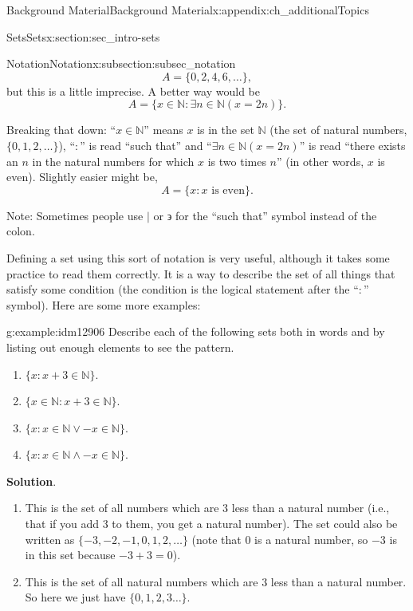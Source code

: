 \documentclass[oneside,10pt,]{book}
\numberwithin{equation}{chapter}
\def\N{\mathbb N}
\def\st{:}
\begin{document}
\begin{appendixptx}{Background Material}{}{Background Material}{}{}{x:appendix:ch_additionalTopics}
\begin{sectionptx}{Sets}{}{Sets}{}{}{x:section:sec_intro-sets}
\begin{subsectionptx}{Notation}{}{Notation}{}{}{x:subsection:subsec_notation}
\begin{equation*}
A = \{0, 2, 4, 6, \ldots\},
\end{equation*}
but this is a little imprecise. A better way would be%
\begin{equation*}
A = \{x \in \N \st \exists n\in \N ( x = 2 n)\}.
\end{equation*}
%
\par
Breaking that down: ``\(x \in \N\)'' means \(x\) is in the set \(\N\) (the set of natural numbers, \(\{0,1,2,\ldots\}\)), ``\(:\)'' is read ``such that'' and ``\(\exists n\in \N (x = 2n) \)'' is read ``there exists an \(n\) in the natural numbers for which \(x\) is two times \(n\)'' (in other words, \(x\) is even). Slightly easier might be,%
\begin{equation*}
A = \{x \st x\text{ is even} \}.
\end{equation*}
%
\par
Note: Sometimes people use \(|\) or \(\backepsilon\) for the ``such that'' symbol instead of the colon.%
\par
Defining a set using this sort of notation is very useful, although it takes some practice to read them correctly. It is a way to describe the set of all things that satisfy some condition (the condition is the logical statement after the ``\(\st\)'' symbol). Here are some more examples:%
\begin{example}{}{g:example:idm12906}%
Describe each of the following sets both in words and by listing out enough elements to see the pattern.%
\par
%
\begin{enumerate}
\item{}\(\{x \st x + 3 \in \N\}\).%
\item{}\(\{x \in \N \st x + 3 \in \N\}\).%
\item{}\(\{x \st x \in \N \vee -x \in \N\}\).%
\item{}\(\{x \st x \in \N \wedge -x \in \N\}\).%
\end{enumerate}
%
\par\smallskip%
\noindent\textbf{Solution}.\hypertarget{g:solution:idm12919}{}\quad{}%
\begin{enumerate}
\item{}This is the set of all numbers which are 3 less than a natural number (i.e., that if you add 3 to them, you get a natural number). The set could also be written as \(\{-3, -2, -1, 0, 1, 2, \ldots\}\) (note that 0 is a natural number, so \(-3\) is in this set because \(-3 + 3 = 0\)).%
\item{}This is the set of all natural numbers which are 3 less than a natural number. So here we just have \(\{0, 1, 2,3 \ldots\}\).%

\end{enumerate}
\end{example}
\end{subsectionptx}
\end{sectionptx}
\end{appendixptx}
\end{document}
